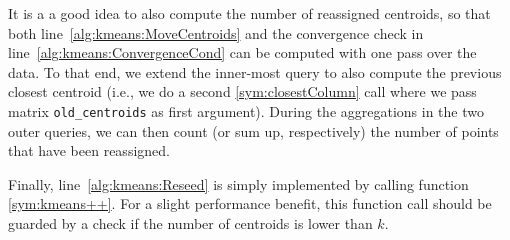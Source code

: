It is a a good idea to also compute the number of reassigned centroids, so that both line~\ref{alg:kmeans:MoveCentroids} and the convergence check in line~\ref{alg:kmeans:ConvergenceCond} can be computed with one pass over the data. To that end, we extend the inner-most query to also compute the previous closest centroid (i.e., we do a second \ref{sym:closestColumn} call where we pass matrix \texttt{old\_centroids} as first argument). During the aggregations in the two outer queries, we can then count (or sum up, respectively) the number of points that have been reassigned.

Finally, line~\ref{alg:kmeans:Reseed} is simply implemented by calling function \ref{sym:kmeans++}. For a slight performance benefit, this function call should be guarded by a check if the number of centroids is lower than $k$.

